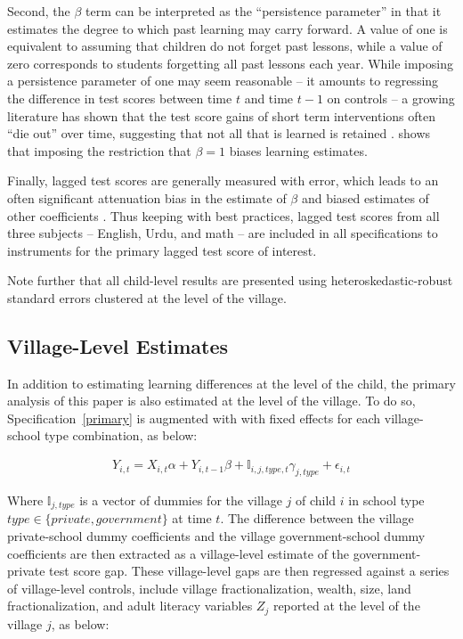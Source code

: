 \documentclass[Eubank_pk_ethnic_sorting.tex]{subfiles}
\begin{document}
Second, the $\beta$ term can be interpreted as the ``persistence parameter'' in that it estimates the degree to which past learning may carry forward. A value of one is equivalent to assuming that children do not forget past lessons, while a value of zero corresponds to students forgetting all past lessons each year. While imposing a persistence parameter of one may seem reasonable -- it amounts to regressing the difference in test scores between time $t$ and time $t-1$ on controls -- a growing literature has shown that the test score gains of short term interventions often ``die out'' over time, suggesting that not all that is learned is retained \citep{Banerjee:2007wx, Glewwe:2010hj,Currie:1995wo, Rothstein:2010bk}. \cite{Andrabi:2011hl} shows that imposing the restriction that $\beta=1$ biases learning estimates.

Finally, lagged test scores are generally measured with error, which leads to an often significant attenuation bias in the estimate of $\beta$ and biased estimates of other coefficients \citep{Kane:2002if,Chay:2005wu,Andrabi:2011hl}. Thus keeping with best practices, lagged test scores from all three subjects -- English, Urdu, and math -- are included in all specifications to instruments for the primary lagged test score of interest.

Note further that all child-level results are presented using heteroskedastic-robust standard errors clustered at the level of the village.

\subsection{Village-Level Estimates}\label{}

In addition to estimating learning differences at the level of the child, the primary analysis of this paper is also estimated at the level of the village. To do so, Specification~\ref{primary} is augmented with with fixed effects for each village-school type combination, as below:

\begin{eqnarray*}
	Y_{i,t}=X_{i,t}\alpha+Y_{i,t-1}\beta + \mathbb{I}_{i,j,type,t}\gamma_{j, type}+\epsilon_{i,t}
\end{eqnarray*}

Where $\mathbb{I}_{j, type}$ is a vector of dummies for the village $j$ of child $i$ in school type $type \in \{private, government\}$ at time $t$. The difference between the village private-school dummy coefficients and the village government-school dummy coefficients are then extracted as a village-level estimate of the government-private test score gap. These village-level gaps are then regressed against a series of village-level controls, include village fractionalization, wealth, size, land fractionalization, and adult literacy variables $Z_{j}$ reported at the level of the village $j$, as below:
\end{document}
